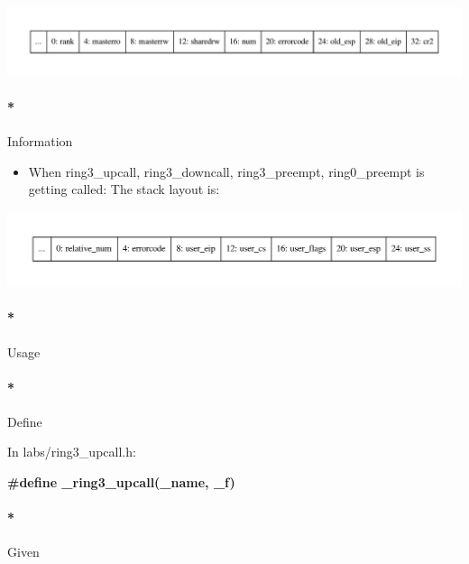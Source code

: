 \documentclass[]{article}
\newenvironment{Shaded}{}{}
\newcommand{\PreprocessorTok}[1]{\textbf{{#1}}}
\providecommand{\tightlist}{%
  \setlength{\itemsep}{0pt}\setlength{\parskip}{0pt}}
\let\oldparagraph\paragraph
\renewcommand{\paragraph}[1]{\oldparagraph{#1}\mbox{}}
\begin{document}
\includegraphics{graphviz-images/d50928bd7002c13646279d8fab8054c249347161.pdf}

\paragraph*{Information}\label{information-11}

\begin{itemize}
\tightlist
\item
  When ring3\_upcall, ring3\_downcall, ring3\_preempt, ring0\_preempt is
  getting called: The stack layout is:
\end{itemize}

\includegraphics{graphviz-images/4b94c712fc5d8fc832a722cc09de70139197fc2d.pdf}

\paragraph*{Usage}\label{usage-11}

\paragraph*{Define}\label{define-11}

In labs/ring3\_upcall.h:

\begin{Shaded}
\begin{Highlighting}[]
   \PreprocessorTok{#define _ring3_upcall(_name, _f)}
\end{Highlighting}
\end{Shaded}

\paragraph*{Given}\label{given-11}
\end{document}
